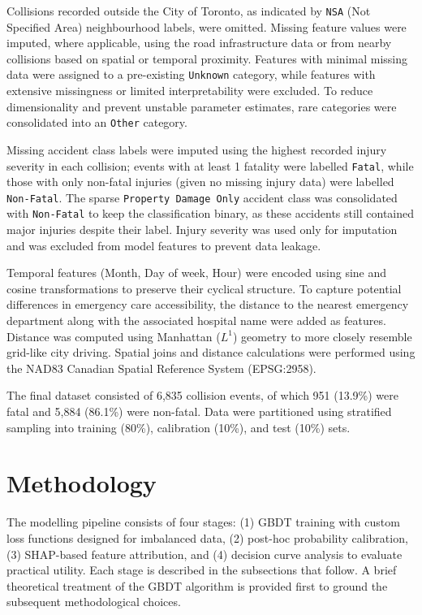 \documentclass{article}
\begin{document}
Collisions recorded outside the City of Toronto, as indicated by \texttt{NSA} (Not Specified Area) neighbourhood labels, were omitted. Missing feature values were imputed, where applicable, using the road infrastructure data or from nearby collisions based on spatial or temporal proximity. Features with minimal missing data were assigned to a pre-existing \texttt{Unknown} category, while features with extensive missingness or limited interpretability were excluded. To reduce dimensionality and prevent unstable parameter estimates, rare categories were consolidated into an \texttt{Other} category.

Missing accident class labels were imputed using the highest recorded injury severity in each collision; events with at least 1 fatality were labelled \texttt{Fatal}, while those with only non-fatal injuries (given no missing injury data) were labelled \texttt{Non-Fatal}. The sparse \texttt{Property Damage Only} accident class was consolidated with \texttt{Non-Fatal} to keep the classification binary, as these accidents still contained major injuries despite their label. Injury severity was used only for imputation and was excluded from model features to prevent data leakage.

Temporal features (Month, Day of week, Hour) were encoded using sine and cosine transformations to preserve their cyclical structure. To capture potential differences in emergency care accessibility, the distance to the nearest emergency department along with the associated hospital name were added as features. Distance was computed using Manhattan ($L^1$) geometry to more closely resemble grid-like city driving. Spatial joins and distance calculations were performed using the NAD83 Canadian Spatial Reference System (EPSG:2958).

The final dataset consisted of 6,835 collision events, of which 951 (13.9\%) were fatal and 5,884 (86.1\%) were non-fatal. Data were partitioned using stratified sampling into training (80\%), calibration (10\%), and test (10\%) sets.


\section{Methodology}
\label{sec:Methodology}

The modelling pipeline consists of four stages: (1) GBDT training with custom loss functions designed for imbalanced data, (2) post-hoc probability calibration, (3) SHAP-based feature attribution, and (4) decision curve analysis to evaluate practical utility. Each stage is described in the subsections that follow. A brief theoretical treatment of the GBDT algorithm is provided first to ground the subsequent methodological choices.
\end{document}
